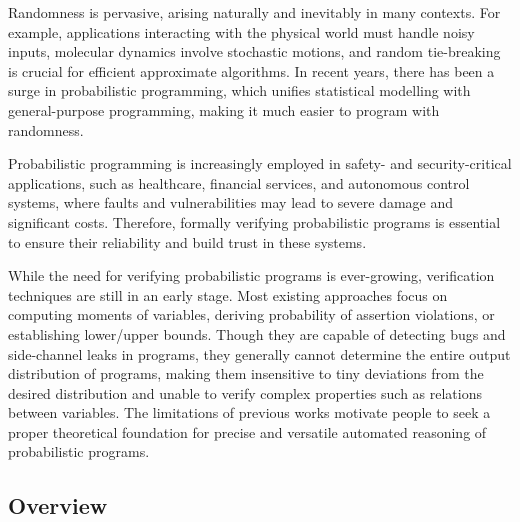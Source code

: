 \documentclass[a4paper]{article}
\begin{document}
Randomness is pervasive, arising naturally and inevitably in many contexts.
For example, applications interacting with the physical world must handle noisy inputs, molecular dynamics involve stochastic motions, and random tie-breaking is crucial for efficient approximate algorithms.
In recent years, there has been a surge in probabilistic programming, which unifies statistical modelling with general-purpose programming, making it much easier to program with randomness.
\par
Probabilistic programming is increasingly employed in safety- and security-critical applications, such as healthcare, financial services, and autonomous control systems,
where faults and vulnerabilities may lead to severe damage and significant costs. Therefore, formally verifying probabilistic programs is essential to ensure their reliability and build trust in these systems.
\par
While the need for verifying probabilistic programs is ever-growing, verification techniques are still in an early stage.
Most existing approaches focus on computing moments of variables\cite{wang2021central}, deriving probability of assertion violations\cite{assert}, or establishing lower/upper bounds\cite{probana}.
Though they are capable of detecting bugs and side-channel leaks in programs, they generally cannot determine the entire output distribution of programs,
making them insensitive to tiny deviations from the desired distribution and unable to verify complex properties such as relations between variables.
The limitations of previous works motivate people to seek a proper theoretical foundation for precise and versatile automated reasoning of probabilistic programs.

\subsection{Overview}
\end{document}
